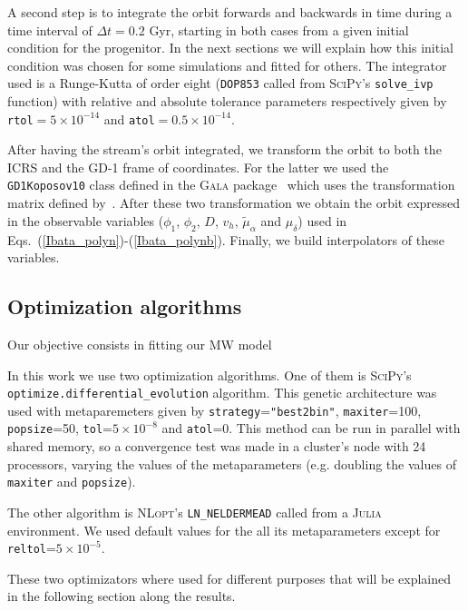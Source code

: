 \documentclass[twocolumn]{aa}
\begin{document}
A second step is to integrate the orbit forwards and backwards in time during a time interval of $\Delta t=0.2$ Gyr, starting in both cases from a given initial condition for the progenitor. In the next sections
we will explain how this initial condition was chosen for some simulations and fitted for others. The integrator used is a Runge-Kutta of order eight (\texttt{DOP853} called from {\scshape{SciPy}}'s \texttt{solve\_ivp} function) with relative and absolute tolerance parameters respectively given by
\texttt{rtol}$=5\times10^{-14}$ and \texttt{atol}$=0.5\times10^{-14}$.

After having the stream's orbit integrated, we transform the orbit to both the ICRS and the GD-1 frame of coordinates. For the latter we used the \texttt{GD1Koposov10} class defined in the {\scshape{Gala}} package~\citep{gala,adrian_price_whelan_2020_4159870} which uses the transformation matrix defined
by~\citet{Koposov_2010}.
After these two transformation we obtain the orbit expressed in the observable variables ($\phi_1$, $\phi_2$, $D$, $v_h$, $\tilde{\mu}_\alpha$ and $\mu_\delta$) used in Eqs.~(\ref{Ibata_polyn})-(\ref{Ibata_polynb}).
Finally, we build interpolators of these variables.


\subsection{Optimization algorithms}
Our objective consists in fitting our MW model

In this work we use two optimization algorithms. One of them is {\scshape{SciPy}}'s
\texttt{optimize.differential\_evolution} algorithm. This genetic architecture
was used with metaparemeters given by
\texttt{strategy}=\texttt{"best2bin"}, \texttt{maxiter}=100, \texttt{popsize}=50,
\texttt{tol}=$5\times10^{-8}$ and \texttt{atol}=0. This method can be run in parallel with shared memory,
so a convergence test was made in a cluster's node with 24 processors, varying the values of the metaparameters (e.g. doubling the values of \texttt{maxiter} and \texttt{popsize}).

The other algorithm is {\scshape{NLopt}}'s
\texttt{LN\_NELDERMEAD} called from a  {\scshape{Julia}}~\citep{bezanson2017julia}
environment. We used default values for the all its metaparameters except for
\texttt{reltol}=$5\times10^{-5}$.

These two optimizators where used for different purposes that will be explained
in the following section along the results.
\end{document}

